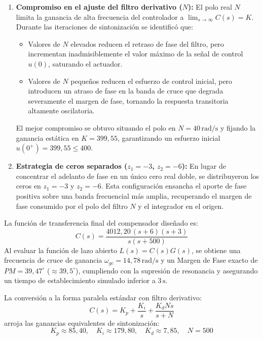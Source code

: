 \begin{enumerate}
  \item \textbf{Compromiso en el ajuste del filtro derivativo ($N$):}
  El polo real $N$ limita la ganancia de alta frecuencia del controlador a $\lim_{s \to \infty} C(s) = K$. Durante las iteraciones de sintonización se identificó que:
  \begin{itemize}
    \item Valores de $N$ elevados reducen el retraso de fase del filtro, pero incrementan inadmisiblemente el valor máximo de la señal de control $u(0)$, saturando el actuador.
    \item Valores de $N$ pequeños reducen el esfuerzo de control inicial, pero introducen un atraso de fase en la banda de cruce que degrada severamente el margen de fase, tornando la respuesta transitoria altamente oscilatoria.
  \end{itemize}
  El mejor compromiso se obtuvo situando el polo en $N = 40\,\mathrm{rad/s}$ y fijando la ganancia estática en $K = 399{,}55$, garantizando un esfuerzo inicial $u(0^+) = 399{,}55 \le 400$.

  \item \textbf{Estrategia de ceros separados ($z_1 = -3$, $z_2 = -6$):}
  En lugar de concentrar el adelanto de fase en un único cero real doble, se distribuyeron los ceros en $z_1 = -3$ y $z_2 = -6$. Esta configuración ensancha el aporte de fase positiva sobre una banda frecuencial más amplia, recuperando el margen de fase consumido por el polo del filtro $N$ y el integrador en el origen.
\end{enumerate}

La función de transferencia final del compensador diseñado es:
\begin{equation}
  C(s) = \frac{4012{,}20\,(s + 6)(s + 3)}{s(s + 500)}
  \label{eq:controlador_disenado}
\end{equation}
Al evaluar la función de lazo abierto $L(s) = C(s)G(s)$, se obtiene una frecuencia de cruce de ganancia $\omega_{gc} = 14{,}78\,\mathrm{rad/s}$ y un Margen de Fase exacto de $PM = 39{,}47^\circ$ ($\approx 39{,}5^\circ$), cumpliendo con la supresión de resonancia y asegurando un tiempo de establecimiento simulado inferior a $3\,\mathrm{s}$.

La conversión a la forma paralela estándar con filtro derivativo:
\begin{equation}
  C(s) = K_p + \frac{K_i}{s} + \frac{K_d N s}{s + N}
\end{equation}
arroja las ganancias equivalentes de sintonización:
\begin{equation}
  K_p \approx 85{,}40, \quad K_i \approx 179{,}80, \quad K_d \approx 7{,}85, \quad N = 500
\end{equation}

